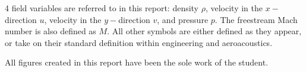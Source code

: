 4 field variables are referred to in this report: density $\rho$, velocity in the $x-$direction $u$, velocity in the $y-$direction $v$, and pressure $p$. The freestream Mach number is also defined as $M$. All other symbols are either defined as they appear, or take on their standard definition within engineering and aeroacoustics.

All figures created in this report have been the sole work of the student.
